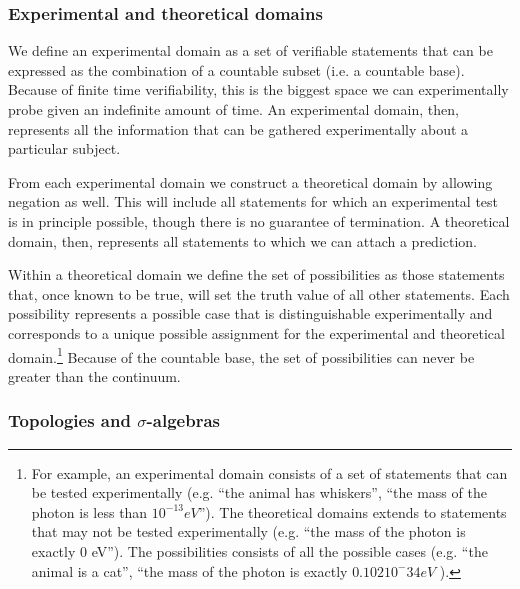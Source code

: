 \documentclass[twocolumn]{article}
\newif\ifextended
\newcommand\fact[2]{\ifextended \emph{#1}. #2 \fi}
\begin{document}
\subsubsection{Experimental and theoretical domains}

We define an experimental domain as a set of verifiable statements that can be expressed as the combination of a countable subset (i.e. a countable base). Because of finite time verifiability, this is the biggest space we can experimentally probe given an indefinite amount of time. An experimental domain, then, represents all the information that can be gathered experimentally about a particular subject.

From each experimental domain we construct a theoretical domain by allowing negation as well. This will include all statements for which an experimental test is in principle possible, though there is no guarantee of termination. A theoretical domain, then, represents all statements to which we can attach a prediction.

Within a theoretical domain we define the set of possibilities as those statements that, once known to be true, will set the truth value of all other statements. Each possibility represents a possible case that is distinguishable experimentally and corresponds to a unique possible assignment for the experimental and theoretical domain.\footnote{For example, an experimental domain consists of a set of statements that can be tested experimentally (e.g. ``the animal has whiskers'', ``the mass of the photon is less than $10^{-13} eV$''). The theoretical domains extends to statements that may not be tested experimentally (e.g. ``the mass of the photon is exactly 0 eV''). The possibilities consists of all the possible cases (e.g. ``the animal is a cat'', ``the mass of the photon is exactly $0.102 10^-{34} eV$ ).} Because of the countable base, the set of possibilities can never be greater than the continuum.

\fact{Maximum cardinality for the possibilities}{Because the domain is generated by a countable set of verifiable statements, the possibilities must be distinguished with a countable sequence of boolean values. This means that the cardinality of the possibilities cannot exceed that of the continuum. This means that higher order infinities and all associated problems do not play a role in science.}


\subsubsection{Topologies and $\sigma$-algebras}
\end{document}
